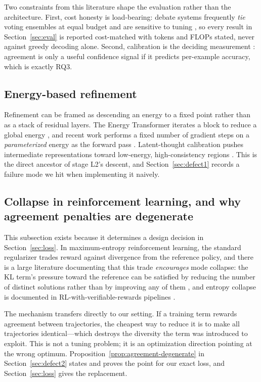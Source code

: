 \documentclass[11pt,a4paper]{article}
\theoremstyle{plain}
\theoremstyle{definition}
\theoremstyle{remark}
\begin{document}
\noindent
Two constraints from this literature shape the evaluation rather than the
architecture. First, cost honesty is load-bearing: debate systems frequently
\emph{tie} voting ensembles at equal budget and are sensitive to tuning
\cite{smit2024mad}, so every result in Section~\ref{sec:eval} is reported
cost-matched with tokens and FLOPs stated, never against greedy decoding
alone. Second, calibration is the deciding measurement
\cite{guo2017calibration}: agreement is only a useful confidence signal if it
predicts per-example accuracy, which is exactly RQ3.

\subsection{Energy-based refinement}

\noindent
Refinement can be framed as descending an energy to a fixed point rather than
as a stack of residual layers. The Energy Transformer iterates a block to
reduce a global energy \cite{energytransformer2023}, and recent work performs
a fixed number of gradient steps on a \emph{parameterized} energy as the
forward pass \cite{nrgpt2025}. Latent-thought calibration pushes intermediate
representations toward low-energy, high-consistency regions
\cite{energycal2025}. This is the direct ancestor of stage L2's descent, and
Section~\ref{sec:defect1} records a failure mode we hit when implementing it
naively.

\subsection{Collapse in reinforcement learning, and why agreement penalties are degenerate}
\label{sec:rl-collapse}

\noindent
This subsection exists because it determines a design decision in
Section~\ref{sec:loss}. In maximum-entropy reinforcement learning, the
standard regularizer trades reward against divergence from the reference
policy, and there is a large literature documenting that this trade
\emph{encourages} mode collapse: the KL term's pressure toward the reference
can be satisfied by reducing the number of distinct solutions rather than by
improving any of them \cite{li2026klcollapse}, and entropy collapse is
documented in RL-with-verifiable-rewards pipelines \cite{acl2026entropy}.

\noindent
The mechanism transfers directly to our setting. If a training term rewards
agreement between trajectories, the cheapest way to reduce it is to make all
trajectories identical---which destroys the diversity the term was introduced
to exploit. This is not a tuning problem; it is an optimization direction
pointing at the wrong optimum. Proposition~\ref{prop:agreement-degenerate}
in Section~\ref{sec:defect2} states and proves the point for our exact loss,
and Section~\ref{sec:loss} gives the replacement.
\end{document}

